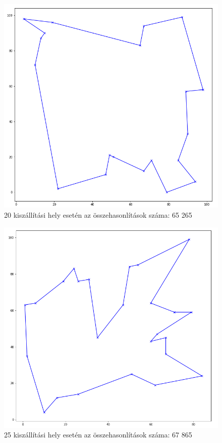 \begin{figure}[h!]
\centering
\includegraphics[scale=0.4]{images/20.png}
\caption{20 kiszállítási hely esetén az összehasonlítások száma: 65 265}
\label{fig:tsp20location}
\end{figure}

\begin{figure}[h!]
\centering
\includegraphics[scale=0.4]{images/25.png}
\caption{25 kiszállítási hely esetén az összehasonlítások száma: 67 865}
\label{fig:tsp25location}
\end{figure}

